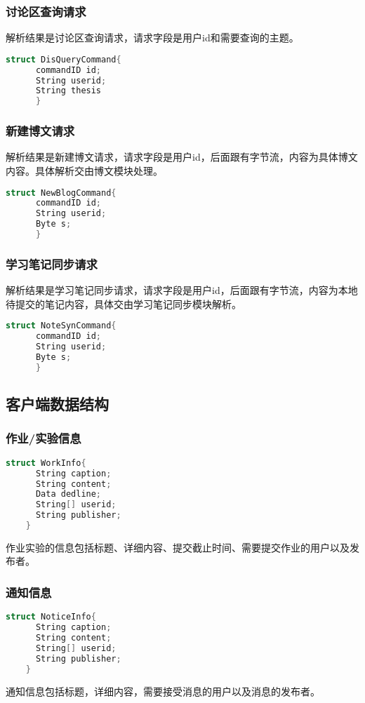     \subsubsection{讨论区查询请求}
    解析结果是讨论区查询请求，请求字段是用户id和需要查询的主题。
    \begin{lstlisting}[language=C,caption=讨论区查询请求]
      struct DisQueryCommand{
      commandID id;
      String userid;
      String thesis
      }
    \end{lstlisting}
    \subsubsection{新建博文请求}
    解析结果是新建博文请求，请求字段是用户id，后面跟有字节流，内容为具体博文内容。具体解析交由博文模块处理。
    \begin{lstlisting}[language=C,caption=新建博文请求]
      struct NewBlogCommand{
      commandID id;
      String userid;
      Byte s;
      }
    \end{lstlisting}
    \subsubsection{学习笔记同步请求}
    解析结果是学习笔记同步请求，请求字段是用户id，后面跟有字节流，内容为本地待提交的笔记内容，具体交由学习笔记同步模块解析。
    \begin{lstlisting}[language=C,caption=学习笔记同步请求]
      struct NoteSynCommand{
      commandID id;
      String userid;
      Byte s;
      }
    \end{lstlisting}
  \subsection{客户端数据结构}
  \subsubsection{作业/实验信息}
  \begin{lstlisting}[language=C,caption=作业/实验信息]
    struct WorkInfo{
      String caption;
      String content;
      Data dedline;
      String[] userid;
      String publisher;
    }
  \end{lstlisting}
  作业实验的信息包括标题、详细内容、提交截止时间、需要提交作业的用户以及发布者。
  \subsubsection{通知信息}
  \begin{lstlisting}[language=C,caption=通知信息]
    struct NoticeInfo{
      String caption;
      String content;
      String[] userid;
      String publisher;
    }
  \end{lstlisting}
  通知信息包括标题，详细内容，需要接受消息的用户以及消息的发布者。
